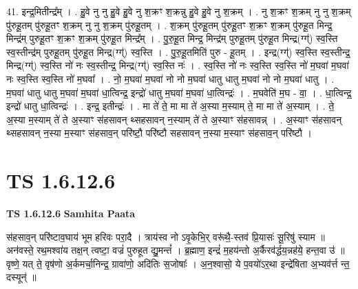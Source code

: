 \documentclass[17pt]{extarticle}
\begin{document}
41. इन्द्र॒मितीन्द्र᳚म् । . हु॒वे नु नु हु॒वे हु॒वे नु श॒क्रꣳ श॒क्रन्नु हु॒वे हु॒वे नु श॒क्रम् । . नु श॒क्रꣳ श॒क्रम् नु नु श॒क्रम् पु॑रुहू॒तम् पु॑रुहू॒तꣳ श॒क्रम् नु नु श॒क्रम् पु॑रुहू॒तम् । . श॒क्रम् पु॑रुहू॒तम् पु॑रुहू॒तꣳ श॒क्रꣳ श॒क्रम् पु॑रुहू॒त मिन्द्र॒ मिन्द्र॑म् पुरुहू॒तꣳ श॒क्रꣳ श॒क्रम् पु॑रुहू॒त मिन्द्र᳚म् । . पु॒रु॒हू॒त मिन्द्र॒ मिन्द्र॑म् पुरुहू॒तम् पु॑रुहू॒त मिन्द्र(ग्ग्॑) स्व॒स्ति स्व॒स्तीन्द्र॑म् पुरुहू॒तम् पु॑रुहू॒त मिन्द्र(ग्ग्॑) स्व॒स्ति । . पु॒रु॒हू॒तमिति॑ पुरु - हू॒तम् । . इन्द्र(ग्ग्॑) स्व॒स्ति स्व॒स्तीन्द्र॒ मिन्द्र(ग्ग्॑) स्व॒स्ति नो॑ नः स्व॒स्तीन्द्र॒ मिन्द्र(ग्ग्॑) स्व॒स्ति नः॑ । . स्व॒स्ति नो॑ नः स्व॒स्ति स्व॒स्ति नो॑ म॒घवा॑ म॒घवा॑ नः स्व॒स्ति स्व॒स्ति नो॑ म॒घवा᳚ । . नो॒ म॒घवा॑ म॒घवा॑ नो नो म॒घवा॑ धातु धातु म॒घवा॑ नो नो म॒घवा॑ धातु । . म॒घवा॑ धातु धातु म॒घवा॑ म॒घवा॑ धा॒त्विन्द्र॒ इन्द्रो॑ धातु म॒घवा॑ म॒घवा॑ धा॒त्विन्द्रः॑ । . म॒घवेति॑ म॒घ - वा॒ । . धा॒त्विन्द्र॒ इन्द्रो॑ धातु धा॒त्विन्द्रः॑ । . इन्द्र॒ इतीन्द्रः॑ । . मा ते॑ ते॒ मा मा ते॑ अ॒स्या म॒स्याम् ते॒ मा मा ते॑ अ॒स्याम् । . ते॒ अ॒स्या म॒स्याम् ते॑ ते अ॒स्याꣳ स॑हसावन् थ्सहसावन् न॒स्याम् ते॑ ते अ॒स्याꣳ स॑हसावन्न् । . अ॒स्याꣳ स॑हसावन् थ्सहसावन् न॒स्या म॒स्याꣳ स॑हसाव॒न् परि॑ष्टौ॒ परि॑ष्टौ सहसावन् न॒स्या म॒स्याꣳ स॑हसाव॒न् परि॑ष्टौ । \newline
\pagebreak
{}

\section{ TS 1.6.12.6 }

\textbf{TS 1.6.12.6 } \newline
\textbf{Samhita Paata} \newline

स॑हसाव॒न् परि॑ष्टाव॒घाय॑ भूम हरिवः परा॒दै । त्राय॑स्व नो ऽवृ॒केभि॒र् वरू॑थै॒-स्तव॑ प्रि॒यासः॑ सू॒रिषु॑ स्याम ॥ अन॑वस्ते॒ रथ॒मश्वा॑य तक्ष॒न् त्वष्टा॒ वज्रं॑ पुरुहूत द्यु॒मन्तं᳚ । ब्र॒ह्माण॒ इन्द्रं॑ म॒हय॑न्तो अ॒र्कैरव॑र्द्धय॒न्नह॑ये॒ हन्त॒वा उ॑ ॥ वृष्णे॒ यत् ते॒ वृष॑णो अ॒र्कमर्चा॒निन्द्र॒ ग्रावा॑णो॒ अदि॑तिः स॒जोषाः᳚ । अ॒न॒श्वासो॒ ये प॒वयो॑ऽर॒था इन्द्रे॑षिता अ॒भ्यव॑र्त्त न्त॒॒ दस्यून्॑ ॥ \newline
\end{document}
